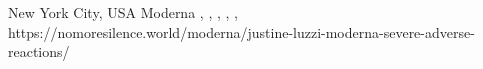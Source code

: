          {
            New York City, USA
          }
          {
          }
          {
            Moderna
          }
          {
            ,
          }
          {
            ,
            ,
            ,
            ,
          }
          {
            https://nomoresilence.world/moderna/justine-luzzi-moderna-severe-adverse-reactions/
          }

